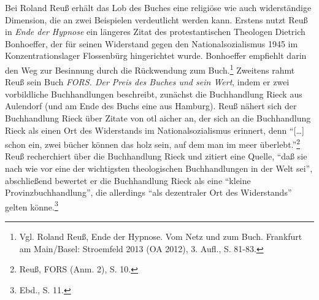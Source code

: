 \documentclass[a4paper,
fontsize=11pt,
oneside,
numbers=noperiodatend,
parskip=half-,
bibliography=totoc,
final
]{scrartcl}
\begin{document}
Bei Roland Reuß erhält das Lob des Buches eine religiöse wie auch
widerständige Dimension, die an zwei Beispielen verdeutlicht werden
kann. Erstens nutzt Reuß in \emph{Ende der Hypnose} ein längeres Zitat
des protestantischen Theologen Dietrich Bonhoeffer, der für seinen
Widerstand gegen den Nationalsozialismus 1945 im Konzentrationslager
Flossenbürg hingerichtet wurde. Bonhoeffer empfiehlt darin den Weg zur
Besinnung durch die Rückwendung zum Buch.\footnote{Vgl. Roland Reuß,
  Ende der Hypnose. Vom Netz und zum Buch. Frankfurt am Main/Basel:
  Stroemfeld 2013 (OA 2012), 3. Aufl., S. 81-83.} Zweitens rahmt Reuß
sein Buch \emph{FORS. Der Preis des Buches und sein Wert}, indem er zwei
vorbildliche Buchhandlungen beschreibt, zunächst die Buchhandlung Rieck
aus Aulendorf (und am Ende des Buchs eine aus Hamburg). Reuß nähert sich
der Buchhandlung Rieck über Zitate von otl aicher an, der sich an die
Buchhandlung Rieck als einen Ort des Widerstands im Nationalsozialismus
erinnert, denn \enquote{{[}\ldots{}{]} schon ein, zwei bücher können das
holz sein, auf dem man im meer überlebt.}\footnote{Reuß, FORS (Anm. 2),
  S. 10.} Reuß recherchiert über die Buchhandlung Rieck und zitiert eine
Quelle, \enquote{daß sie nach wie vor eine der wichtigsten theologischen
Buchhandlungen in der Welt sei}, abschließend bewertet er die
Buchhandlung Rieck als eine \enquote{kleine Provinzbuchhandlung}, die
allerdings \enquote{als dezentraler Ort des Widerstands} gelten
könne.\footnote{Ebd., S. 11.}
\end{document}
